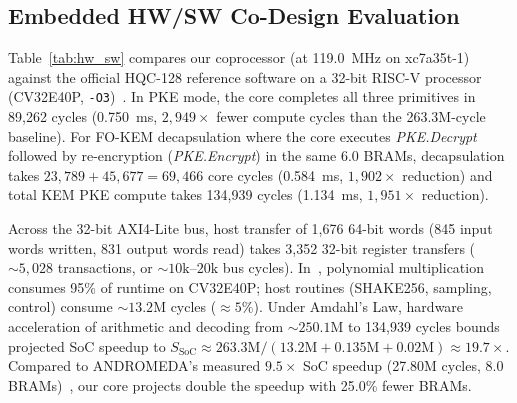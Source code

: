 \documentclass[journal]{IEEEtran}
\begin{document}
\begin{table}[t]
\centering
\caption{Cycle Comparison vs. 32-Bit RISC-V Software~\cite{ras2025optimizing}}
\label{tab:hw_sw}
\end{table}

\subsection{Embedded HW/SW Co-Design Evaluation}
Table~\ref{tab:hw_sw} compares our coprocessor (at 119.0~MHz on xc7a35t-1) against the official HQC-128 reference software on a 32-bit RISC-V processor (CV32E40P, \texttt{-O3})~\cite{ras2025optimizing}. In PKE mode, the core completes all three primitives in 89,262 cycles (0.750~ms, $2,949\times$ fewer compute cycles than the 263.3M-cycle baseline). For FO-KEM decapsulation where the core executes \textit{PKE.Decrypt} followed by re-encryption (\textit{PKE.Encrypt}) in the same 6.0 BRAMs, decapsulation takes $23,789 + 45,677 = 69,466$ core cycles (0.584~ms, $1,902\times$ reduction) and total KEM PKE compute takes 134,939 cycles (1.134~ms, $1,951\times$ reduction).

Across the 32-bit AXI4-Lite bus, host transfer of 1,676 64-bit words (845 input words written, 831 output words read) takes 3,352 32-bit register transfers (${\sim}5,028$ transactions, or ${\sim}10\text{k}$--$20\text{k}$ bus cycles). In~\cite{ras2025optimizing}, polynomial multiplication consumes 95\% of runtime on CV32E40P; host routines (SHAKE256, sampling, control) consume ${\sim}13.2\text{M}$ cycles ($\approx 5\%$). Under Amdahl's Law, hardware acceleration of arithmetic and decoding from ${\sim}250.1\text{M}$ to 134,939 cycles bounds projected SoC speedup to $S_{\text{SoC}} \approx 263.3\text{M} / (13.2\text{M} + 0.135\text{M} + 0.02\text{M}) \approx 19.7\times$. Compared to ANDROMEDA's measured $9.5\times$ SoC speedup (27.80M cycles, 8.0 BRAMs)~\cite{ras2025optimizing}, our core projects double the speedup with 25.0\% fewer BRAMs.
\end{document}
